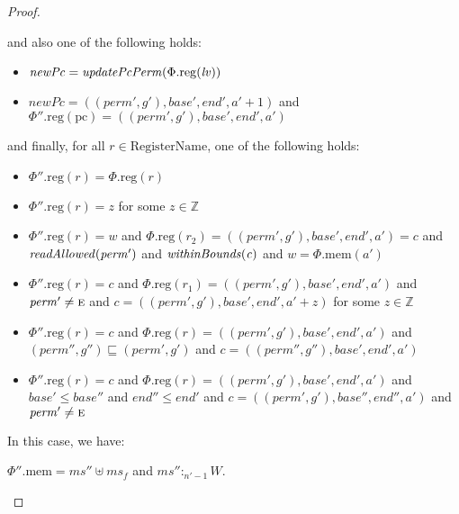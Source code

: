 \documentclass[a4paper]{article}
\newcommand{\update}[2]{[#1 \mapsto #2]}
\newcommand{\var}[1]{\mathit{#1}}
\newcommand{\hs}{\var{ms}}
\newcommand{\ms}{\hs}
\newcommand{\lv}{\var{lv}}
\newcommand{\gl}{\var{g}}
\newcommand{\pcreg}{\mathrm{pc}}
\newcommand{\addr}{\var{a}}
\newcommand{\start}{\var{base}}
\newcommand{\addrend}{\var{end}}
\newcommand{\heap}{\var{mem}}
\newcommand{\perm}{\var{perm}}
\newcommand{\plainproj}[1]{\mathrm{#1}}
\newcommand{\memheap}[1][\Phi]{#1.\plainproj{mem}}
\newcommand{\memreg}[1][\Phi]{#1.\plainproj{reg}}
\newcommand{\plainfun}[2]{
  \ifthenelse{\equal{#2}{}}
  {\mathit{#1}}
  {\mathit{#1}(#2)}
}
\newcommand{\updatePcPerm}[1]{\plainfun{updatePcPerm}{#1}}
\newcommand{\readAllowed}[1]{\plainfun{readAllowed}{#1}}
\newcommand{\writeAllowed}[1]{\plainfun{writeAllowed}{#1}}
\newcommand{\withinBounds}[1]{\plainfun{withinBounds}{#1}}
\newcommand{\heapSat}[3][\heap]{#1 :_{#2} #3}
\newcommand{\plaindom}[1]{\mathrm{#1}}
\newcommand{\RegName}{\plaindom{RegisterName}}
\newcommand{\ints}{\mathbb{Z}}
\newcommand{\plainperm}[1]{\textsc{#1}}
\newcommand{\entry}{\plainperm{e}}
\begin{document}
\begin{proof}
\begin{enumproof}
    and also one of the following holds:
    \begin{itemize}
    \item $\var{newPc}= \updatePcPerm{\memreg(\lv)}$
    \item $\var{newPc} = ((\perm',\gl'),\start',\addrend',\addr' + 1)$ and
      $\memreg[\Phi''](\pcreg) = ((\perm',\gl'),\start',\addrend',\addr')$
    \end{itemize}
    and finally, for all $r \in \RegName$, one of the following
    holds:
    \begin{itemize}
    \item $\memreg[\Phi''](r) = \memreg[\Phi](r)$
    \item $\memreg[\Phi''](r) = z$ for some $z \in \ints$
    \item $\memreg[\Phi''](r) = \var{w}$ and $\memreg(r_2) =
      ((\perm',\gl'),\start',\addrend',\addr') = \var{c}$ and
      $\readAllowed{\perm'}$ and $\withinBounds{\var{c}}$ and $\var{w} =
      \memheap(\addr')$
    \item $\memreg[\Phi''](r) = \var{c}$ and $\memreg(r_1) =
      ((\perm',\gl'),\start',\addrend',\addr')$ and $\perm' \neq \entry$ and
      $\var{c} = ((\perm',\gl'),\start',\addrend',\addr' + z)$ for some $z \in
      \ints$
    \item $\memreg[\Phi''](r) = \var{c}$ and $\memreg(r) =
      ((\perm',\gl'),\start',\addrend',\addr')$ and $(\perm'',\gl'')\sqsubseteq
      (\perm',\gl')$ and $c = ((\perm'',\gl''),\start',\addrend',\addr')$
    \item $\memreg[\Phi''](r) = \var{c}$ and $\memreg(r) =
      ((\perm',\gl'),\start',\addrend',\addr')$ and $\start' \leq \start''$ and
      $\addrend'' \leq \addrend'$ and $c =
      ((\perm',\gl'),\start'',\addrend'',\addr')$ and $\perm' \neq \entry$
    \end{itemize}
    In this case, we have:
    \begin{enumproof}
    \item $\memheap[\Phi''] = \ms'' \uplus \ms_f$ and $\heapSat[\ms'']{n'-1}{W}$.
\end{enumproof}
\end{enumproof}
\end{proof}
\end{document}
